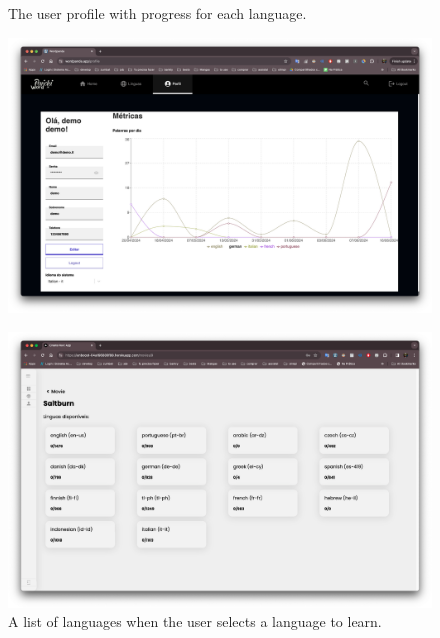 \documentclass[12pt]{article}
\begin{document}
\begin{frame}{}
  \begin{figure}[!h]
      \begin{minipage}[b]{0.5\linewidth}
        \centering
        \caption{
        The user profile with progress for each language.
        }
        \label{fig:site3}
        \includegraphics[width=1\textwidth]{assets/22.png}

      \end{minipage}
      \hspace{0.2cm}
      \begin{minipage}[b]{0.5\linewidth}
        \centering
        \caption{
        A list of languages when the user selects a language to learn.
        }
        \label{fig:site4}
        \includegraphics[width=1\textwidth]{assets/25.png}
      \end{minipage}
  \end{figure}
\end{frame}
\end{document}
